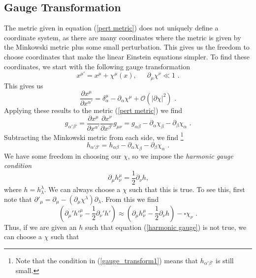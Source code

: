 \documentclass[11pt]{cuthesis}
\newcommand{\mn}{_{\mu\nu}}
\newcommand{\fs}{\text{ .}}
\newcommand{\pd}{\partial}
\begin{document}
\subsection{Gauge Transformation}
The metric given in equation (\ref{pert metric}) does not uniquely define a coordinate system, as there are many coordinates where the metric is given by the Minkowski metric plus some small perturbation. This gives us the freedom to choose coordinates that make the linear Einstein equations simpler. To find these coordinates, we start with the following gauge transformation
\begin{equation} \label{gauge_transform1}
x^{\mu'}=x^\mu +\chi ^\mu (x)\text{,} \hspace{20pt}\partial_\mu \chi^\nu \ll 1\fs
\end{equation} 
This gives us
\begin{equation}
\frac{\pd x^\mu}{\pd x^{\alpha'}}=\delta^\mu_\alpha-\pd_\alpha\chi^\mu +\mathcal{O}(|\pd \chi|^2) \fs
\end{equation}  
Applying these results to the metric (\ref{pert metric}) we find
\begin{equation} 
g_{\alpha' \beta'}=\frac{\pd x^\mu}{\pd x^{\alpha'}}\frac{\pd x^\nu}{\pd x^{\beta'}}g\mn=g_{\alpha \beta}-\pd_\alpha \chi_\beta -\pd_\beta \chi_\alpha \fs
\end{equation}
Subtracting the Minkowski metric from each side, we find \footnote{Note that the condition in (\ref{gauge_transform1}) means that $h_{\alpha'\beta'}$ is still small.}
\begin{equation} \label{pert transf}
h_{\alpha' \beta'}=h_{\alpha \beta}-\pd_\alpha\chi_\beta-\pd_\beta\chi_\alpha \fs
\end{equation}
We have some freedom in choosing our $\chi$, so we impose the \textit{harmonic gauge condition}
\begin{equation} \label{harmonic gauge}
\partial_\mu h^\mu_\nu = \frac{1}{2} \partial_\nu h \text{,}
\end{equation}
where $h=h^\lambda_\lambda$. We can always choose a $\chi$ such that this is true. To see this, first note that $\partial'_\mu = \partial_\mu - (\partial_\mu \chi^\lambda) \partial_\lambda$. From this we find
\begin{equation}
(\partial_\mu' {h'}_\nu^\mu - \frac{1}{2}\partial_\nu' h') \approx (\partial_\mu h^\mu_\nu - \frac{1}{2} \partial_\nu h ) -\square \chi_\nu \fs
\end{equation}
Thus, if we are given an $h$ such that equation (\ref{harmonic gauge}) is not true, we can choose a $\chi$ such that 
\end{document}
